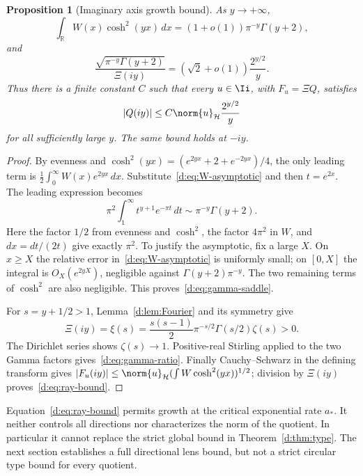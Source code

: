 \documentclass[11pt,a4paper]{article}
\numberwithin{equation}{section}
\newtheorem{proposition}[theorem]{Proposition}
\theoremstyle{definition}\newtheorem{definition}[theorem]{Definition}
\theoremstyle{remark}\newtheorem{remark}[theorem]{Remark}
\newcommand{\R}{\mathbb R}\newcommand{\C}{\mathbb C}\newcommand{\N}{\mathbb N}
\newcommand{\Hh}{\mathcal H}\newcommand{\Hw}{\mathcal H}
\begin{document}
\begin{proposition}[Imaginary axis growth bound]\label{d:prop:ray}
As $y\to+\infty$,
\begin{equation}\label{d:eq:gamma-saddle}
 \int_\R W(x)\cosh^2(yx)\,dx
 =(1+o(1))\pi^{-y}\Gamma(y+2),
\end{equation}
and
\begin{equation}\label{d:eq:gamma-ratio}
 \frac{\sqrt{\pi^{-y}\Gamma(y+2)}}{\Xi(iy)}
 =(\sqrt2+o(1))\frac{2^{y/2}}{y}.
\end{equation}
Thus there is a finite constant $C$ such that every $u\in\Ii$, with $F_u=\Xi Q$, satisfies
\begin{equation}\label{d:eq:ray-bound}
 |Q(iy)|\le C\norm{u}_{\Hh}\frac{2^{y/2}}{y}
\end{equation}
for all sufficiently large $y$. The same bound holds at $-iy$.
\end{proposition}
\begin{proof}
By evenness and $\cosh^2(yx)=(e^{2yx}+2+e^{-2yx})/4$, the only leading term is
$\frac12\int_0^\infty W(x)e^{2yx}\,dx$. Substitute~\eqref{d:eq:W-asymptotic} and then $t=e^{2x}$. The leading expression becomes
\[
 \pi^2\int_1^\infty t^{y+1}e^{-\pi t}\,dt
 \sim\pi^{-y}\Gamma(y+2).
\]
Here the factor $1/2$ from evenness and $\cosh^2$, the factor $4\pi^2$ in $W$, and $dx=dt/(2t)$ give exactly $\pi^2$. To justify the asymptotic, fix a large $X$. On $x\ge X$ the relative error in~\eqref{d:eq:W-asymptotic} is uniformly small; on $[0,X]$ the integral is $O_X(e^{2yX})$, negligible against $\Gamma(y+2)\pi^{-y}$. The two remaining terms of $\cosh^2$ are also negligible. This proves~\eqref{d:eq:gamma-saddle}.

For $s=y+1/2>1$, Lemma~\ref{d:lem:Fourier} and its symmetry give
\[
 \Xi(iy)=\xi(s)=\frac{s(s-1)}2\pi^{-s/2}\Gamma(s/2)\zeta(s)>0.
\]
The Dirichlet series shows $\zeta(s)\to1$. Positive-real Stirling applied to the two Gamma factors gives~\eqref{d:eq:gamma-ratio}. Finally Cauchy--Schwarz in the defining transform gives
$|F_u(iy)|\le\norm{u}_{\Hh}(\int W\cosh^2(yx))^{1/2}$; division by $\Xi(iy)$ proves~\eqref{d:eq:ray-bound}.
\end{proof}

Equation~\eqref{d:eq:ray-bound} permits growth at the critical exponential rate $a_*$. It neither controls all directions nor characterizes the norm of the quotient. In particular it cannot replace the strict global bound in Theorem~\ref{d:thm:type}. The next section establishes a full directional lens bound, but not a strict circular type bound for every quotient.
\end{document}
